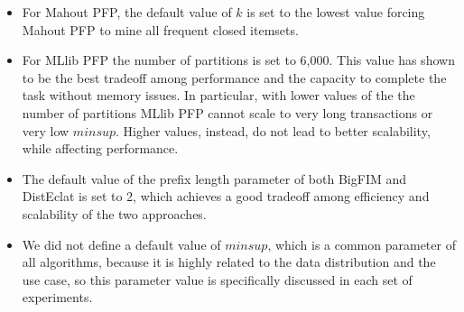 \begin{itemize}
\item
For Mahout PFP, the default value of $k$ is set to the lowest value forcing
Mahout PFP to mine all frequent closed itemsets.
\item
For MLlib PFP the number of partitions is set to 6,000.
This value has shown to be the best tradeoff among performance
and the capacity to complete the task without memory issues.
In particular, with lower values of the the number of partitions MLlib PFP
cannot scale to very long transactions or very low $minsup$.
Higher values, instead, do not lead to better scalability, while affecting performance.
\item
The default value
of the prefix length parameter of both BigFIM and DistEclat is set to 2, which achieves a good tradeoff 
among efficiency and scalability of the two approaches.


\item We did not define a default value of $minsup$,
which is a common parameter of all algorithms, 
because it is highly related to the data distribution and the use case, 
so this parameter value is specifically discussed in each set of experiments.
\end{itemize}





